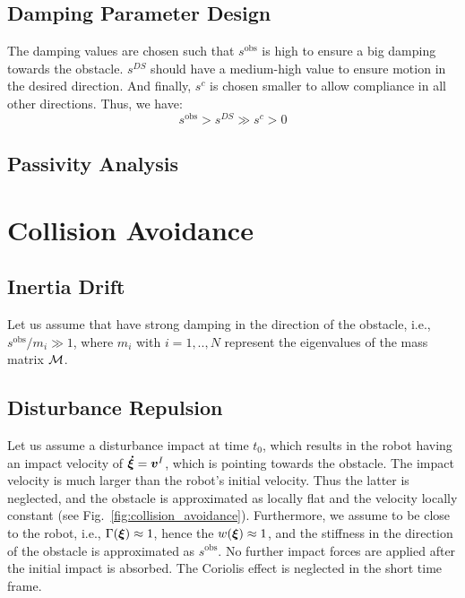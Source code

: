 \documentclass[conference]{IEEEtran}
\begin{document}
\subsection{Damping Parameter Design}
The damping values are chosen such that $s^{\mathrm{obs}}$ is high to ensure a big damping towards the obstacle. $s^{DS}$ should have a medium-high value to ensure motion in the desired direction. And finally, $s^{c}$ is chosen smaller to allow compliance in all other directions. Thus, we have:
\begin{equation}
s^{\mathrm{obs}} > s^{DS} \gg s^{c} > 0
\end{equation}

\subsection{Passivity Analysis}


\section{Collision Avoidance}


\subsection{Inertia Drift}
Let us assume that have strong damping in the direction of the obstacle, i.e., $s^{\mathrm{obs}} / m_i \gg 1$, where $m_i$ with $i = 1, .., N$ represent the eigenvalues of the mass matrix $\mathcal{M}$. 


\subsection{Disturbance Repulsion}
Let us assume a disturbance impact at time $t_0$, which results in the robot having an impact velocity of $\boldsymbol{\dot \xi} = \boldsymbol{v}^I$, which is pointing towards the obstacle. The impact velocity is much larger than the robot's initial velocity. Thus the latter is neglected, and the obstacle is approximated as locally flat and the velocity locally constant (see Fig.~\ref{fig:collision_avoidance}). Furthermore, we assume to be close to the robot, i.e., $\Gamma(\boldsymbol{\xi}) \approx 1$, hence the $w(\boldsymbol{\xi}) \approx 1$, and the stiffness in the direction of the obstacle is approximated as $s^{\mathrm{obs}}$.
No further impact forces are applied after the initial impact is absorbed. The Coriolis effect is neglected in the short time frame.
\end{document}
